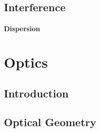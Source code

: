 \documentclass[10pt]{report}
\begin{document}
\section{Interference}
\clearpage
\clearpage

\subsubsection{Dispersion}
\clearpage

\chapter{Optics}
\clearpage
\section{Introduction}
\clearpage

\section{Optical Geometry}
\clearpage
\printbibliography
\end{document}
